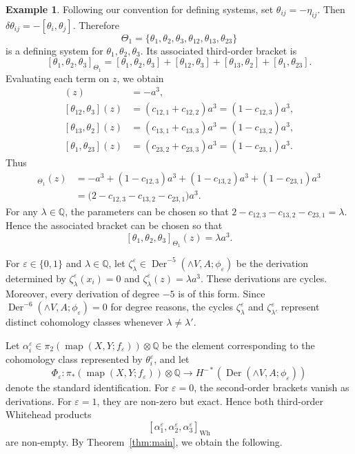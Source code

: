 \documentclass[a4paper,10pt]{amsart}
\theoremstyle{definition}
\newtheorem{ex}[thm]{Example}
\theoremstyle{remark}
\newcommand{\map}{\operatorname{map}}
\newcommand{\Der}{\operatorname{Der}}
\numberwithin{equation}{section}
\begin{document}
\begin{ex}
Following our convention for defining systems, set
$
\theta_{ij}=-\eta_{ij}.
$
Then
$
\delta\theta_{ij}=-[\theta_i,\theta_j].
$
Therefore
\[
\Theta_1
=
\{\theta_1,\theta_2,\theta_3,
  \theta_{12},\theta_{13},\theta_{23}\}
\]
is a defining system for $\theta_1,\theta_2,\theta_3$.
Its associated third-order bracket is
\[
[\theta_1,\theta_2,\theta_3]_{\Theta_1}
=
[\theta_1,\theta_2,\theta_3]
+
[\theta_{12},\theta_3]
+
[\theta_{13},\theta_2]
+
[\theta_1,\theta_{23}].
\]
Evaluating each term on $z$, we obtain
\begin{align*}
[\theta_1,\theta_2,\theta_3](z)
&=
-a^3,\\
[\theta_{12},\theta_3](z)
&=
(c_{12,1}+c_{12,2})a^3
=
(1-c_{12,3})a^3,\\
[\theta_{13},\theta_2](z)
&=
(c_{13,1}+c_{13,3})a^3
=
(1-c_{13,2})a^3,\\
[\theta_1,\theta_{23}](z)
&=
(c_{23,2}+c_{23,3})a^3
=
(1-c_{23,1})a^3.
\end{align*}
Thus
\begin{align*}
[\theta_1,\theta_2,\theta_3]_{\Theta_1}(z)
&=
-a^3
+
(1-c_{12,3})a^3
+
(1-c_{13,2})a^3
+
(1-c_{23,1})a^3\\
&=
\bigl(
2-c_{12,3}-c_{13,2}-c_{23,1}
\bigr)a^3.
\end{align*}
For any $\lambda\in\mathbb{Q}$, the parameters can be chosen so that
$
2-c_{12,3}-c_{13,2}-c_{23,1}=\lambda.
$
Hence the associated bracket can be chosen so that
\[
[\theta_1,\theta_2,\theta_3]_{\Theta_1}(z)
=
\lambda a^3.
\]

For $\varepsilon\in\{0,1\}$ and $\lambda\in\mathbb{Q}$, let
$
\zeta_\lambda^\varepsilon
\in
\Der^{-5}(\wedge V,A;\phi_\varepsilon)
$
be the derivation determined by
$
\zeta_\lambda^\varepsilon(x_i)=0
$
and
$
\zeta_\lambda^\varepsilon(z)=\lambda a^3.
$
These derivations are cycles. Moreover, every derivation of degree $-5$ is
of this form. 
Since
$
\Der^{-6}(\wedge V,A;\phi_\varepsilon)=0
$
for degree reasons, the cycles
$\zeta_\lambda^\varepsilon$ and
$\zeta_{\lambda'}^\varepsilon$ represent distinct cohomology classes whenever
$\lambda\neq\lambda'$.

Let
$
\alpha_i^\varepsilon
\in
\pi_2(\map(X,Y;f_\varepsilon))\otimes\mathbb{Q}
$
be the element corresponding to the cohomology class represented by
$\theta_i^\varepsilon$, and let
\[
\Phi_\varepsilon:
\pi_*(\map(X,Y;f_\varepsilon))\otimes\mathbb{Q}
\longrightarrow
H^{-*}(\Der(\wedge V,A;\phi_\varepsilon))
\]
denote the standard identification.
For $\varepsilon=0$, the second-order brackets vanish as derivations.
For $\varepsilon=1$, they are non-zero but exact. Hence both third-order
Whitehead products
\[
[\alpha_1^\varepsilon,
 \alpha_2^\varepsilon,
 \alpha_3^\varepsilon]_{\mathrm{Wh}}
\]
are non-empty.
By Theorem~\ref{thm:main}, we obtain the following.


\end{ex}
\end{document}
